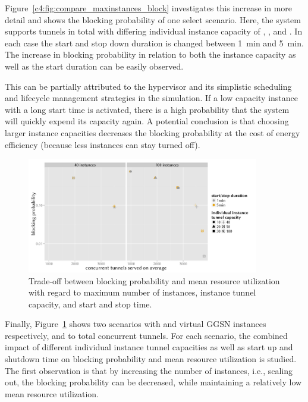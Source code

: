 Figure~\ref{c4:fig:compare_maxinstances_block} investigates this increase in more detail and shows the blocking probability of one select scenario. Here, the system supports  tunnels in total with differing individual instance capacity of , , and . In each case the start and stop down duration is changed between \SI{1}{\minute} and \SI{5}{\minute}. The increase in blocking probability in relation to both the instance capacity as well as the start duration can be easily observed.

This can be partially attributed to the hypervisor and its simplistic scheduling  and lifecycle management strategies in the simulation. If a low capacity instance with a long start time is activated, there is a high probability that the system will quickly expend its capacity again.
A potential conclusion is that choosing larger instance capacities decreases the blocking probability at the cost of energy efficiency (because less instances can stay turned off).

\begin{figure}[htbp]
	\centering
	\includegraphics[width=0.9\textwidth]{images/R-virtualized-startstop-tunnelusage-blocking-comparison.pdf}
	\caption{Trade-off between blocking probability and mean resource utilization with regard to maximum number of instances, instance tunnel capacity, and start and stop time.}
\label{c4:fig:compare_util_block}
\end{figure}

Finally, Figure~\ref{c4:fig:compare_util_block} shows two scenarios with  and  virtual \gls{GGSN} instances respectively, and  to  total concurrent tunnels. For each scenario, the combined impact of different individual instance tunnel capacities as well as start up and shutdown time on blocking probability and mean resource utilization is studied. The first observation is that by increasing the number of instances, i.e., scaling out, the blocking probability can be decreased, while maintaining a relatively low mean resource utilization. 

